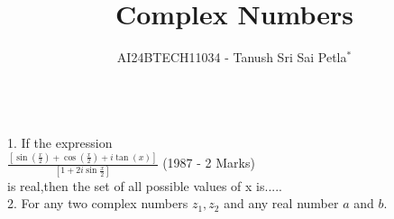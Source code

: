 \documentclass[journal,12pt,twocolumn]{IEEEtran}
\theoremstyle{remark}
\begin{document}

\vspace{3cm}

\title{Complex Numbers}
\author{AI24BTECH11034 - Tanush Sri Sai Petla$^{*}$%
}

\\
1. If the expression    \\        

$\frac{[\sin(\frac{x}{2}) + \cos(\frac{x}{2}) + i\tan(x)]}{[1+2i\sin\frac{x}{2}]}$   \hfill(1987 - 2 Marks)\\
is real,then the set of all possible values of x is.....\\
2.  For any two complex numbers $z_1,z_2$ and any real number $a$ and $b$.
\end{document}
